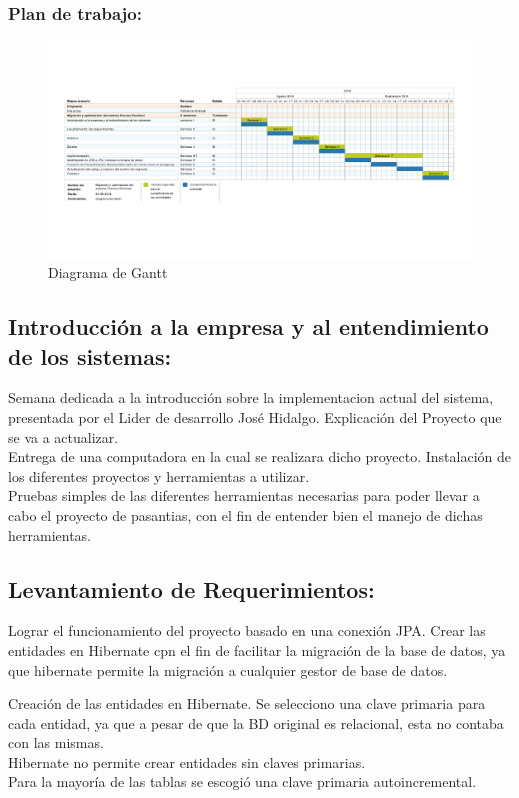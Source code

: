 \documentclass[spanish]{article}
\begin{document}
\subsubsection{Plan de trabajo:}

\begin{figure}[htb]
	\centering
	\includegraphics[width=1\textwidth]{diagrama1.png}
	\caption{Diagrama de Gantt}
	\label{i1}
\end{figure}


\subsection{Introducción a la empresa y al entendimiento de los sistemas:}
Semana dedicada a la introducción sobre la implementacion actual del sistema, presentada por el Lider de desarrollo José Hidalgo. Explicación del Proyecto que se va a actualizar. \\
Entrega de una computadora en la cual se realizara dicho proyecto.
Instalación de los diferentes proyectos y herramientas a utilizar. \\
Pruebas simples de las diferentes herramientas necesarias para poder llevar a cabo el proyecto de pasantias, con el fin de entender bien el manejo de dichas herramientas.

\subsection{Levantamiento de Requerimientos:}
Lograr el funcionamiento del proyecto basado en una conexión JPA. Crear las entidades en Hibernate cpn el fin de facilitar la migración de la base de datos, ya que hibernate permite la migración a cualquier gestor de base de datos. 

Creación de las entidades en Hibernate. Se selecciono una clave primaria para cada entidad, ya que a pesar de que la BD original es relacional, esta no contaba con las mismas. \\
Hibernate no permite crear entidades sin claves primarias. \\
 Para la mayoría de las tablas se escogió una clave primaria autoincremental.
 
\end{document}
